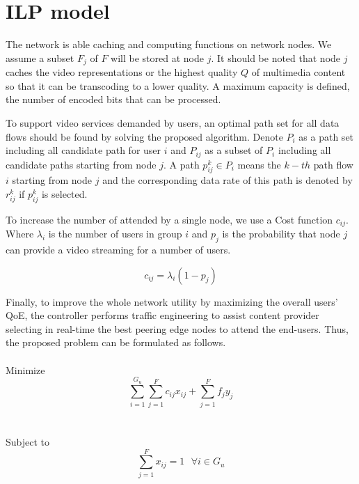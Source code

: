 \section{ILP model}
\label{sec:ilp-solution}

The network is able caching and computing functions on network nodes. We assume a subset $F_{j}$ of $F$ will be stored at node $j$. It should be noted that node $j$ caches the video representations or the highest quality $Q$ of multimedia content so that it can be transcoding to a lower quality. A maximum capacity is defined, the number of encoded bits that can be processed.

To support video services demanded by users, an optimal path set for all data flows should be found by solving the proposed algorithm. Denote $P_{i}$ as a path set including all candidate path for user $i$ and $P_{ij}$ as a subset of $P_{i}$ including all candidate paths starting from node $j$. A path $p_{ij}^{k} \in P_{i}$ means the $k-th$ path flow $i$ starting from node $j$ and the corresponding data rate of this path is denoted by $r_{ij}^{k}$ if $p_{ij}^{k}$ is selected.



To increase the number of attended by a single node, we use a Cost function $c_{ij}$. Where $\lambda_{i}$ is the number of users in group $i$ and $p_{j}$ is the probability that node $j$ can provide a video streaming for a number of users. 


\begin{equation}\label{cost_func}
c_{ij} = \lambda_{i} (1 - p_{j})
\end{equation}


Finally, to improve the whole network utility by maximizing the overall users' QoE, the controller performs traffic engineering to assist content provider selecting in real-time the best peering edge nodes to attend the end-users. Thus, the proposed problem can be formulated as follows.
\\
\\
Minimize
\begin{equation}
\sum^{G_u}_{i=1}\sum^{F}_{j=1} c_{ij}x_{ij} + \sum^{F}_{j=1} f_{j} y_{j} \label{eq:maximize}
\end{equation}
\\
\\
Subject to
\begin{equation}\label{bound_1}
\sum^{F}_{j=1} x_{ij} = 1 \text{ } \forall i \in G_u
\end{equation}

